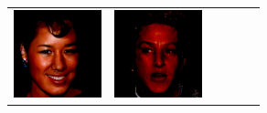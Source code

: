 \documentclass{article}
\newcommand{\pganw}{1.0in}
\begin{document}
\begin{table}[htbp]
\begin{center}
\begin{tabular}{cc|cc|cc}
\includegraphics[width=\pganw]{figures/pgan/8_base_iso_MH.png} &
\includegraphics[width=\pganw]{figures/pgan/9_base_iso_MH.png} \\

\end{tabular}
\end{center}
\end{table}
\end{document}
